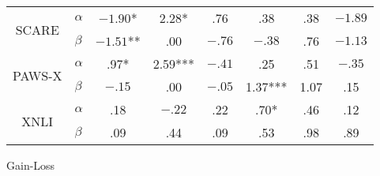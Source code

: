 {{\begin{tabular}{llc|c|c|c|c|c}
      \multicolumn{1}{c}{\multirow{2}{*}{SCARE}}   & $\alpha$  & \multicolumn{1}{c|}{\cellcolor{dark-blue} $-1.90$*}   & \multicolumn{1}{c|}{\cellcolor{dark-blue} 2.28*}     & \multicolumn{1}{c|}{\cellcolor{dark-blue} .76}        & \multicolumn{1}{c|}{\cellcolor{dark-blue} .38}         & \multicolumn{1}{c|}{\cellcolor{dark-blue} .38}      & \multicolumn{1}{c}{\cellcolor{blue} $-1.89$}        \\
      \multicolumn{1}{c}{}                         & $\beta$   & \multicolumn{1}{c|}{\cellcolor{blue} $-1.51$**}       & \multicolumn{1}{c|}{\cellcolor{light-blue} .00}      & \multicolumn{1}{c|}{\cellcolor{blue} $-.76$}          & \multicolumn{1}{c|}{\cellcolor{dark-blue} $-.38$}      & \multicolumn{1}{c|}{\cellcolor{blue} .76}           & \multicolumn{1}{c}{\cellcolor{dark-blue} $-1.13$}   \\ \cline{3-8}
      \multicolumn{1}{c}{\multirow{2}{*}{PAWS-X}}  & $\alpha$  & \multicolumn{1}{c|}{\cellcolor{blue} .97*}            & \multicolumn{1}{c|}{\cellcolor{dark-blue} 2.59***}   & \multicolumn{1}{c|}{\cellcolor{blue} $-.41$}          & \multicolumn{1}{c|}{\cellcolor{dark-blue} .25}         & \multicolumn{1}{c|}{\cellcolor{light-blue} .51}     & \multicolumn{1}{c}{\cellcolor{dark-blue} $-.35$}    \\
      \multicolumn{1}{c}{}                         & $\beta$   & \multicolumn{1}{c|}{\cellcolor{dark-blue} $-.15$}     & \multicolumn{1}{c|}{\cellcolor{light-blue} .00}      & \multicolumn{1}{c|}{\cellcolor{dark-blue} $-.05$}     & \multicolumn{1}{c|}{\cellcolor{dark-blue} 1.37***}     & \multicolumn{1}{c|}{\cellcolor{dark-blue} 1.07}     & \multicolumn{1}{c}{\cellcolor{dark-blue} .15}       \\ \cline{3-8}
      \multicolumn{1}{c}{\multirow{2}{*}{XNLI}}    & $\alpha$  & \multicolumn{1}{c|}{\cellcolor{blue} .18}             & \multicolumn{1}{c|}{\cellcolor{blue} $-.22$}         & \multicolumn{1}{c|}{\cellcolor{blue} .22}             & \multicolumn{1}{c|}{\cellcolor{blue} .70*}             & \multicolumn{1}{c|}{\cellcolor{dark-blue} .46}      & \multicolumn{1}{c}{\cellcolor{dark-blue} .12}       \\
      \multicolumn{1}{c}{}                         & $\beta$   & \multicolumn{1}{c|}{\cellcolor{blue} .09}             & \multicolumn{1}{c|}{\cellcolor{dark-blue} .44}       & \multicolumn{1}{c|}{\cellcolor{dark-blue} .09}        & \multicolumn{1}{c|}{\cellcolor{blue} .53}              & \multicolumn{1}{c|}{\cellcolor{blue} .98}           & \multicolumn{1}{c}{\cellcolor{dark-blue} .89}
      \end{tabular}
    }
  }{Gain-Loss}



